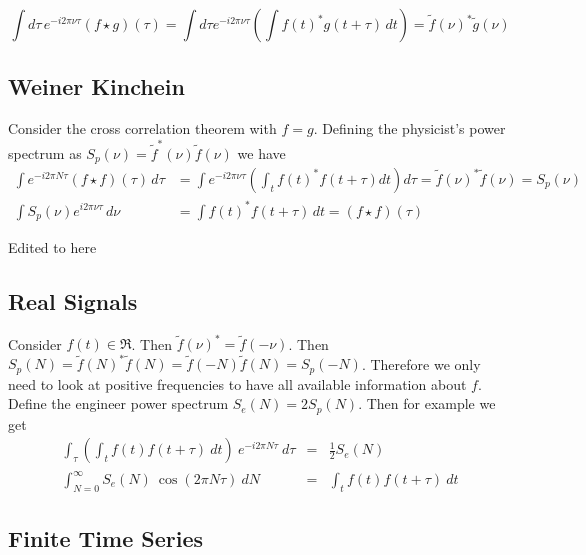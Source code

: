 \documentclass{article}
\begin{document}
\begin{equation*}
  \int d\tau \, e^{-i 2 \pi \nu \tau} \left( f \star g \right)(\tau)
  = \int d\tau e^{-i 2 \pi \nu \tau}
    \left( \int f(t)^{*} g(t + \tau) \, dt \right)
  = \tilde{f}(\nu)^* \tilde{g}(\nu)
\end{equation*}

\subsection{Weiner Kinchein}

Consider the cross correlation theorem with $f=g$.
Defining the physicist's power spectrum as $S_{p}(\nu)=\tilde{f}^{*}(\nu)\tilde{f}(\nu)$ we have
\begin{align*}
  \int e^{-i 2 \pi N \tau}(f \star f)(\tau) \, d\tau
  &= \int e^{-i 2\pi \nu \tau}
    \left( \int_{t} f(t)^* f(t + \tau) dt \right) d\tau
  =\tilde{f}(\nu)^* \tilde{f}(\nu) = S_{p}(\nu) \\
  \int S_{p}(\nu) e^{i 2 \pi \nu \tau} \, d\nu
  &= \int f(t)^* f(t + \tau) \, dt = (f \star f)(\tau)
\end{align*}

Edited to here

\subsection*{Real Signals}

Consider $f(t)\in\Re$. Then $\tilde{f}(\nu)^{*}=\tilde{f}(-\nu)$.
Then $S_{p}(N)=\tilde{f}(N)^{*}\tilde{f}(N)=\tilde{f}(-N)\tilde{f}(N)=S_{p}(-N)$.
Therefore we only need to look at positive frequencies to have all
available information about $f$. Define the engineer power spectrum
$S_{e}(N)=2S_{p}(N)$. Then for example we get \begin{eqnarray*}
\int_{\tau}\left(\int_{t}f(t)f(t+\tau)~dt\right)\: e^{-i2\pi N\tau}\: d\tau & = & \frac{1}{2}S_{e}(N)\\
\int_{N=0}^{\infty}S_{e}(N)\:\cos(2\pi N\tau)\: dN & = & \int_{t}f(t)f(t+\tau)\: dt\end{eqnarray*}

\subsection*{Finite Time Series}
\end{document}
